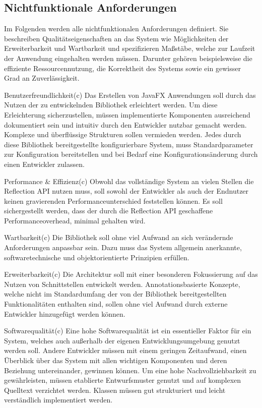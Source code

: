 \subsection{Nichtfunktionale Anforderungen}
\label{anforderungsanalyse_nichtfunktional}
Im Folgenden werden alle nichtfunktionalen Anforderungen definiert. Sie beschreiben Qualitätseigenschaften an das System wie Möglichkeiten der Erweiterbarkeit und Wartbarkeit und spezifizieren Maßstäbe, welche zur Laufzeit der Anwendung eingehalten werden müssen. Darunter gehören beispielsweise die effiziente Ressourcennutzung, die Korrektheit des Systems sowie ein gewisser Grad an Zuverlässigkeit.
\begin{nreq}{Benutzerfreundlichkeit}(c)
	Das Erstellen von JavaFX Anwendungen soll durch das Nutzen der zu entwickelnden Bibliothek erleichtert werden. Um diese Erleichterung sicherzustellen, müssen implementierte Komponenten ausreichend dokumentiert sein und intuitiv durch den Entwickler nutzbar gemacht werden. Komplexe und überflüssige Strukturen sollen vermieden werden. Jedes durch diese Bibliothek bereitgestellte konfigurierbare System, muss Standardparameter zur Konfiguration bereitstellen und bei Bedarf eine Konfigurationsänderung durch einen Entwickler zulassen.
\end{nreq}
\begin{nreq}{Performance \& Effizienz}(c)
	Obwohl das vollständige System an vielen Stellen die Reflection API nutzen muss, soll sowohl der Entwickler als auch der Endnutzer keinen gravierenden Performanceunterschied feststellen können. Es soll sichergestellt werden, dass der durch die Reflection API geschaffene Performanceoverhead, minimal gehalten wird.
\end{nreq}
\begin{nreq}{Wartbarkeit}(c)
	Die Bibliothek soll ohne viel Aufwand an sich verändernde Anforderungen anpassbar sein. Dazu muss das System allgemein anerkannte, softwaretechnische und objektorientierte Prinzipien erfüllen.
\end{nreq}
\begin{nreq}{Erweiterbarkeit}(c)
	Die Architektur soll mit einer besonderen Fokussierung auf das Nutzen von Schnittstellen entwickelt werden. Annotationsbasierte Konzepte, welche nicht im Standardumfang der von der Bibliothek bereitgestellten Funktionalitäten enthalten sind, sollen ohne viel Aufwand durch externe Entwickler hinzugefügt werden können.
\end{nreq}
\begin{nreq}{Softwarequalität}(c)
	Eine hohe Softwarequalität ist ein essentieller Faktor für ein System, welches auch außerhalb der eigenen Entwicklungsumgebung genutzt werden soll. Andere Entwickler müssen mit einem geringen Zeitaufwand, einen Überblick über das System mit allen wichtigen Komponenten und deren Beziehung untereinander, gewinnen können. Um eine hohe Nachvollziehbarkeit zu gewährleisten, müssen etablierte Entwurfsmuster genutzt und auf komplexen Quelltext verzichtet werden. Klassen müssen gut strukturiert und leicht verständlich implementiert werden.
\end{nreq}

